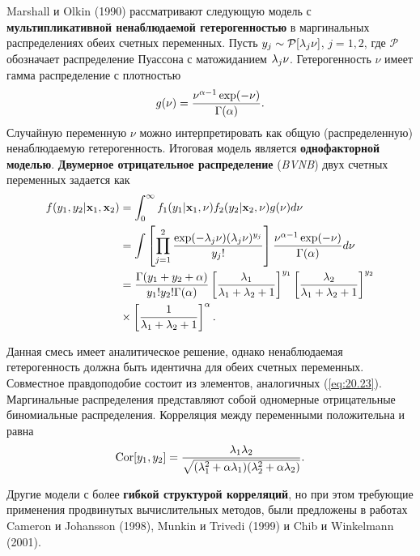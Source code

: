 Marshall и Olkin (1990) рассматривают следующую модель с \textbf{мультипликативной ненаблюдаемой гетерогенностью} в маргинальных распределениях обеих счетных переменных. Пусть $y_j \sim \mathcal{P}[\lambda_j\nu]$, $j = 1, 2$, где $\mathcal{P}$ обозначает распределение Пуассона с матожиданием $\lambda_j\nu$. Гетерогенность $\nu$ имеет гамма распределение с плотностью
        $$g(\nu) = \frac{\nu^{\alpha - 1}\exp(-\nu)}{\Gamma(\alpha)}.$$
Случайную переменную $\nu$ можно интерпретировать как общую (распределенную) ненаблюдаемую гетерогенность. Итоговая модель является \textbf{однофакторной моделью}. \textbf{Двумерное отрицательное распределение} (\textit{BVNB}) двух счетных переменных задается как
    \begin{align}\label{eq:20.23}
    f(y_1, y_2|\mathbf{x}_1, \mathbf{x}_2)  &= \int^{\infty}_{0} f_1(y_1|\mathbf{x}_1, \nu) f_2(y_2|\mathbf{x}_2, \nu) g(\nu) d\nu \\
                            &= \int \left[ \prod^2_{j = 1}\frac{\exp(-\lambda_j\nu)(\lambda_j\nu)^{y_j}}{y_j!}  \right] \frac{\nu^{\alpha - 1} \exp(-\nu)}{\Gamma(\alpha)} d\nu \notag \\
                            &= \frac{\Gamma(y_1 + y_2 + \alpha)}{y_1! y_2! \Gamma(\alpha)} \left[ \frac{\lambda_1}{\lambda_1 + \lambda_2 + 1} \right]^{y_1} \left[ \frac{\lambda_2}{\lambda_1 + \lambda_2 + 1} \right]^{y_2} \notag \\
                            &\times \left[ \frac{1}{\lambda_1 + \lambda_2 + 1} \right]^{\alpha}. \notag
    \end{align}

Данная смесь имеет аналитическое решение, однако ненаблюдаемая гетерогенность должна быть идентична для обеих счетных переменных. Совместное правдоподобие состоит из элементов, аналогичных (\ref{eq:20.23}). Маргинальные распределения представляют собой одномерные отрицательные биномиальные распределения. Корреляция между переменными положительна и равна
    \begin{align}\label{eq:20.24}
    \mathrm{Cor}[y_1, y_2] = \frac{\lambda_1 \lambda_2}{\sqrt{(\lambda_1^2 + \alpha \lambda_1)(\lambda_2^2 + \alpha \lambda_2)}}.
    \end{align}

Другие модели с более \textbf{гибкой структурой корреляций}, но при этом требующие применения продвинутых вычислительных методов, были предложены в работах Cameron и Johansson (1998), Munkin и Trivedi (1999) и Chib и Winkelmann (2001).

